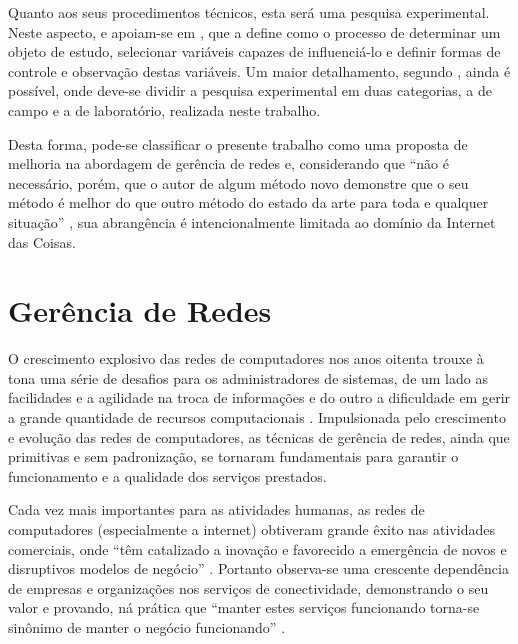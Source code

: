 \documentclass[twoside,english,brazilian]{UNISINOSmonografia}
\begin{document}
Quanto aos seus procedimentos técnicos, esta será uma pesquisa experimental. 
Neste aspecto,  e  
apoiam-se em , que a define como o processo de determinar um 
objeto de estudo, selecionar variáveis capazes de influenciá-lo e definir 
formas de controle e observação destas variáveis.
Um maior detalhamento, segundo , ainda é possível, onde 
deve-se dividir a pesquisa experimental em duas categorias, a de campo e a de 
laboratório, realizada neste trabalho.

Desta forma, pode-se classificar o presente trabalho como uma proposta de 
melhoria na abordagem de gerência de redes e, considerando que ``não é 
necessário, porém, que o autor de algum método novo demonstre que o seu método 
é melhor do que outro método do estado da arte para toda e qualquer situação'' 
\cite{Wazlawick2008}, sua abrangência é intencionalmente limitada ao 
domínio da Internet das Coisas.



\chapter{Gerência de Redes}


O crescimento explosivo das redes de computadores nos anos oitenta trouxe à 
tona uma série de desafios para os administradores de sistemas, de um lado as 
facilidades e a agilidade na troca de informações e do outro a dificuldade em 
gerir a grande quantidade de recursos computacionais \cite{stallings1999snmp}.
Impulsionada pelo crescimento e evolução das redes de computadores, as 
técnicas de gerência de redes, ainda que primitivas e sem padronização, se 
tornaram fundamentais para garantir o 
funcionamento e a qualidade dos serviços prestados.  


Cada vez mais importantes para as atividades humanas, as redes de computadores 
(especialmente a internet) obtiveram grande êxito nas atividades comerciais, 
onde ``têm catalizado a inovação e favorecido a emergência de novos e 
disruptivos modelos de negócio'' \cite[p.~23]{Ding2009}.
Portanto observa-se uma crescente dependência de empresas e organizações nos 
serviços de conectividade, demonstrando o seu valor e provando, ná prática
que ``manter estes serviços funcionando torna-se sinônimo de manter o 
negócio funcionando''
\cite[p.~xix]{Clemm2006}.
\end{document}
